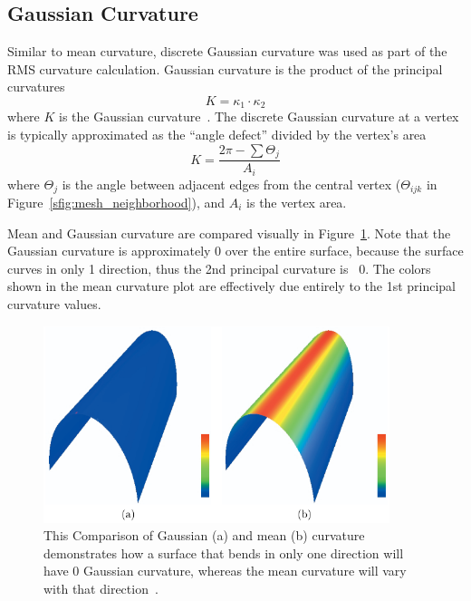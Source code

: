 \subsection{Gaussian Curvature}\label{sec:gauss_k}
Similar to mean curvature, discrete Gaussian curvature was used as part of the RMS curvature calculation.
Gaussian curvature is the product of the principal curvatures
\begin{equation}\label{eq:gauss_k}
	K = \kappa_1 \cdot \kappa_2
\end{equation}
where $K$ is the Gaussian curvature~\cite{TheoremaEgregium}.
The discrete Gaussian curvature at a vertex is typically approximated as the ``angle defect'' divided by the vertex's area
\begin{equation}\label{eq:disc_gauss_k}
	K = \frac{2\pi - \sum \Theta_j}{A_i}
\end{equation}
where $\Theta_j$ is the angle between adjacent edges from the central vertex ($\Theta_{ijk}$ in Figure~\ref{sfig:mesh_neighborhood}), and $A_i$ is the vertex area.

Mean and Gaussian curvature are compared visually in Figure~\ref{fig:mean_gauss_k}.
Note that the Gaussian curvature is approximately 0 over the entire surface, because the surface curves in only 1 direction, thus the 2nd principal curvature is ~0.
The colors shown in the mean curvature plot are effectively due entirely to the 1st principal curvature values.

\begin{figure}
	\centering
	\includegraphics[width=0.9\textwidth]{../resources/curvature/gaussian_mean_k.png}
	\caption{This Comparison of Gaussian (a) and mean (b) curvature demonstrates how a surface that bends in only one direction will have 0 Gaussian curvature, whereas the mean curvature will vary with that direction~\cite{Imp_k_estimation_for_WS}.}
	\label{fig:mean_gauss_k} %
\end{figure}

